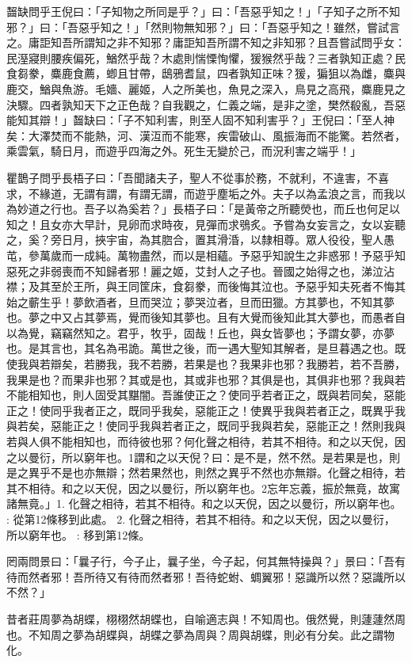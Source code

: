 \begin{pinyinscope}
齧缺問乎王倪曰：「子知物之所同是乎？」曰：「吾惡乎知之！」「子知子之所不知邪？」曰：「吾惡乎知之！」「然則物無知邪？」曰：「吾惡乎知之！雖然，嘗試言之。庸詎知吾所謂知之非不知邪？庸詎知吾所謂不知之非知邪？且吾嘗試問乎女：民溼寢則腰疾偏死，鰌然乎哉？木處則惴慄恂懼，猨猴然乎哉？三者孰知正處？民食芻豢，麋鹿食薦，蝍且甘帶，鴟鴉耆鼠，四者孰知正味？猨，猵狙以為雌，麋與鹿交，鰌與魚游。毛嬙、麗姬，人之所美也，魚見之深入，鳥見之高飛，麋鹿見之決驟。四者孰知天下之正色哉？自我觀之，仁義之端，是非之塗，樊然殽亂，吾惡能知其辯！」齧缺曰：「子不知利害，則至人固不知利害乎？」王倪曰：「至人神矣：大澤焚而不能熱，河、漢沍而不能寒，疾雷破山、風振海而不能驚。若然者，乘雲氣，騎日月，而遊乎四海之外。死生无變於己，而況利害之端乎！」

瞿鵲子問乎長梧子曰：「吾聞諸夫子，聖人不從事於務，不就利，不違害，不喜求，不緣道，无謂有謂，有謂无謂，而遊乎塵垢之外。夫子以為孟浪之言，而我以為妙道之行也。吾子以為奚若？」長梧子曰：「是黃帝之所聽熒也，而丘也何足以知之！且女亦大早計，見卵而求時夜，見彈而求鴞炙。予嘗為女妄言之，女以妄聽之，奚？旁日月，挾宇宙，為其脗合，置其滑涽，以隸相尊。眾人役役，聖人愚芚，參萬歲而一成純。萬物盡然，而以是相蘊。予惡乎知說生之非惑邪！予惡乎知惡死之非弱喪而不知歸者邪！麗之姬，艾封人之子也。晉國之始得之也，涕泣沾襟；及其至於王所，與王同筐床，食芻豢，而後悔其泣也。予惡乎知夫死者不悔其始之蘄生乎！夢飲酒者，旦而哭泣；夢哭泣者，旦而田獵。方其夢也，不知其夢也。夢之中又占其夢焉，覺而後知其夢也。且有大覺而後知此其大夢也，而愚者自以為覺，竊竊然知之。君乎，牧乎，固哉！丘也，與女皆夢也；予謂女夢，亦夢也。是其言也，其名為弔詭。萬世之後，而一遇大聖知其解者，是旦暮遇之也。既使我與若辯矣，若勝我，我不若勝，若果是也？我果非也邪？我勝若，若不吾勝，我果是也？而果非也邪？其或是也，其或非也邪？其俱是也，其俱非也邪？我與若不能相知也，則人固受其黮闇。吾誰使正之？使同乎若者正之，既與若同矣，惡能正之！使同乎我者正之，既同乎我矣，惡能正之！使異乎我與若者正之，既異乎我與若矣，惡能正之！使同乎我與若者正之，既同乎我與若矣，惡能正之！然則我與若與人俱不能相知也，而待彼也邪？何化聲之相待，若其不相待。和之以天倪，因之以曼衍，所以窮年也。1謂和之以天倪？曰：是不是，然不然。是若果是也，則是之異乎不是也亦無辯；然若果然也，則然之異乎不然也亦無辯。化聲之相待，若其不相待。和之以天倪，因之以曼衍，所以窮年也。2忘年忘義，振於無竟，故寓諸無竟。」1. 化聲之相待，若其不相待。和之以天倪，因之以曼衍，所以窮年也。 : 從第12條移到此處。  2. 化聲之相待，若其不相待。和之以天倪，因之以曼衍，所以窮年也。 : 移到第12條。

罔兩問景曰：「曩子行，今子止，曩子坐，今子起，何其無特操與？」景曰：「吾有待而然者邪！吾所待又有待而然者邪！吾待蛇蚹、蜩翼邪！惡識所以然？惡識所以不然？」

昔者莊周夢為胡蝶，栩栩然胡蝶也，自喻適志與！不知周也。俄然覺，則蘧蘧然周也。不知周之夢為胡蝶與，胡蝶之夢為周與？周與胡蝶，則必有分矣。此之謂物化。


\end{pinyinscope}